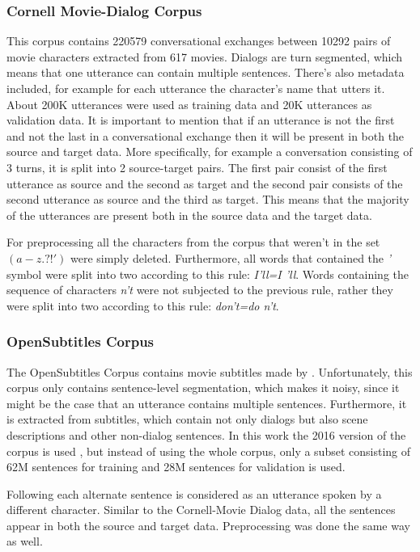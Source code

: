 \documentclass[12pt]{article}
\begin{document}
\subsubsection{Cornell Movie-Dialog Corpus} \label{sssec:cornell}
This corpus contains 220579 conversational exchanges between 10292 pairs of movie characters extracted from 617 movies. Dialogs are turn segmented, which means that one utterance can contain multiple sentences. There's also metadata included, for example for each utterance the character's name that utters it. About 200K utterances were used as training data and 20K utterances as validation data. It is important to mention that if an utterance is not the first and not the last in a conversational exchange then it will be present in both the source and target data. More specifically, for example a conversation consisting of 3 turns, it is split into 2 source-target pairs. The first pair consist of the first utterance as source and the second as target and the second pair consists of the second utterance as source and the third as target. This means that the majority of the utterances are present both in the source data and the target data.

For preprocessing all the characters from the corpus that weren't in the set \((a-z . ? ! ')\) were simply deleted. Furthermore, all words that contained the \textit{'} symbol were split into two according to this rule: \textit{I'll=I 'll}. Words containing the sequence of characters \textit{n't} were not subjected to the previous rule, rather they were split into two according to this rule: \textit{don't=do n't}.

\subsubsection{OpenSubtitles Corpus} \label{sssec:opensubs}
The OpenSubtitles Corpus contains movie subtitles made by \cite{opensubtitles}. Unfortunately, this corpus only contains sentence-level segmentation, which makes it noisy, since it might be the case that an utterance contains multiple sentences. Furthermore, it is extracted from subtitles, which contain not only dialogs but also scene descriptions and other non-dialog sentences. In this work the 2016 version of the corpus is used \cite{OpenSubtitles:2016}, but instead of using the whole corpus, only a subset consisting of 62M sentences for training and 28M sentences for validation is used.

Following \cite{Vinyals:2015} each alternate sentence is considered as an utterance spoken by a different character. Similar to the Cornell-Movie Dialog data, all the sentences appear in both the source and target data. Preprocessing was done the same way as well.
\end{document}
